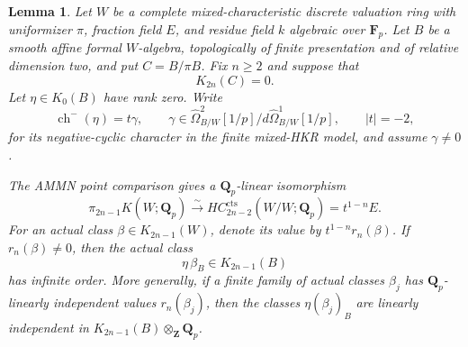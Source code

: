 \documentclass[11pt,a4paper]{amsart}
\numberwithin{equation}{section}
\newtheorem{lemma}[theorem]{Lemma}
\theoremstyle{definition}
\theoremstyle{remark}
\begin{document}
\begin{lemma}
\label{d3:lem:formalhigherTCcup}
Let $W$ be a complete mixed-characteristic discrete valuation ring
with uniformizer $\pi$, fraction field $E$, and residue field $k$
algebraic over $\mathbf F_p$. Let $B$ be a smooth affine formal
$W$-algebra, topologically of finite presentation and of relative
dimension two, and put $C=B/\pi B$.
Fix $n\geq2$ and suppose that
\[
 K_{2n}(C)=0.
\]
Let $\eta\in K_0(B)$ have rank zero. Write
\[
 \operatorname{ch}^-(\eta)=t\gamma,
 \qquad
 \gamma\in\widehat\Omega^2_{B/W}[1/p]
               /d\widehat\Omega^1_{B/W}[1/p],
 \qquad |t|=-2,
\]
for its negative-cyclic character in the finite mixed-HKR model,
and assume $\gamma\ne0$.

The AMMN point comparison gives a $\mathbf Q_p$-linear isomorphism
\[
 \pi_{2n-1}K(W;\mathbf Q_p)
       \xrightarrow{\ \sim\ }
 HC_{2n-2}^{\mathrm{cts}}(W/W;\mathbf Q_p)
       =t^{1-n}E.
\]
For an actual class $\beta\in K_{2n-1}(W)$, denote its value by
$t^{1-n}r_n(\beta)$. If $r_n(\beta)\ne0$, then the actual class
\[
                  \eta\,\beta_B\in K_{2n-1}(B)
\]
has infinite order. More generally, if a finite family of actual
classes $\beta_j$ has $\mathbf Q_p$-linearly independent values
$r_n(\beta_j)$, then the classes $\eta(\beta_j)_B$ are linearly
independent in $K_{2n-1}(B)\otimes_{\mathbf Z}\mathbf Q_p$.
\end{lemma}
\end{document}

